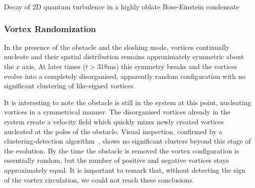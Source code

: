 \begin{chapter}{\label{cha:shin}Decay of 2D quantum turbulence in a highly oblate Bose-Einstein condensate}
\subsubsection{Vortex Randomization}
In the presence of the obstacle and the sloshing mode,
vortices continually nucleate and their spatial distribution remains
approximately symmetric about the $x$ axis.  
At later times ($t>318$ms) this symmetry breaks and the vortices 
evolve into a completely disorganised, apparently random 
configuration with no significant clustering of like-signed vortices.  


It is interesting to note the obstacle is still in the system 
at this point, nucleating vortices in a symmetrical manner. 
The disorganised vortices already in the system create a velocity 
field which quickly mixes newly created vortices nucleated at the
poles of the obstacle. Visual inspection, confirmed by a 
clustering-detection algorithm~\citep{white12,reeves_billam_13}, 
shows no significant clusters beyond this stage of the evolution. 
By the time the obstacle is removed the vortex configuration is 
essentially random, but 
the number of positive and negative vortices stays approximately equal.
It is important to remark that, without detecting the sign of the vortex circulation, we
could not reach these conclusions.


\end{chapter}
